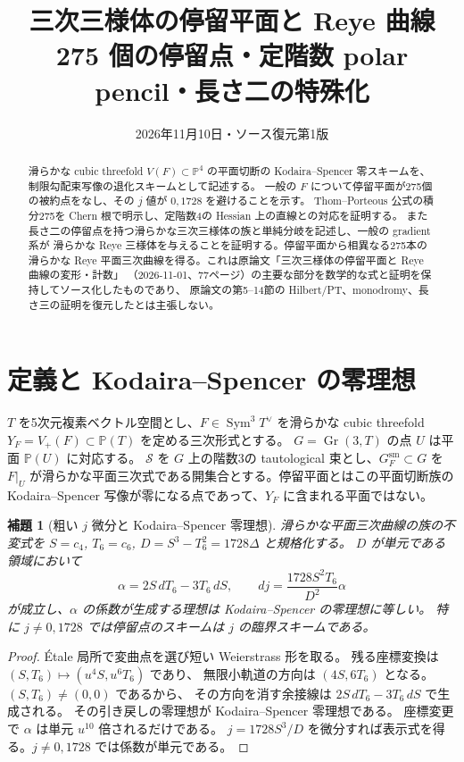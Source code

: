 \documentclass[11pt,a4paper]{ltjsarticle}
\title{三次三様体の停留平面と Reye 曲線\\\large 275 個の停留点・定階数 polar pencil・長さ二の特殊化}
\author{}
\date{2026年11月10日・ソース復元第1版}
\newtheorem{lemma}[theorem]{補題}
\newcommand{\PP}{\mathbb P}
\newcommand{\Gr}{\operatorname{Gr}}
\newcommand{\Sym}{\operatorname{Sym}}
\newcommand{\cS}{\mathcal S}
\begin{document}
\maketitle
\begin{abstract}
滑らかな cubic threefold $V(F)\subset\PP^4$ の平面切断の
Kodaira--Spencer 零スキームを、制限勾配束写像の退化スキームとして記述する。
一般の $F$ について停留平面が275個の被約点をなし、その $j$ 値が $0,1728$ を避けることを示す。
Thom--Porteous 公式の積分275を Chern 根で明示し、定階数4の Hessian 上の直線との対応を証明する。
また長さ二の停留点を持つ滑らかな三次三様体の族と単純分岐を記述し、一般の gradient 系が
滑らかな Reye 三様体を与えることを証明する。停留平面から相異なる275本の滑らかな
Reye 平面三次曲線を得る。これは原論文「三次三様体の停留平面と Reye 曲線の変形・計数」
（2026-11-01、77ページ）の主要な部分を数学的な式と証明を保持してソース化したものであり、
原論文の第5--14節の Hilbert/PT、monodromy、長さ三の証明を復元したとは主張しない。
\end{abstract}
\tableofcontents

\section{定義と Kodaira--Spencer の零理想}
$T$ を5次元複素ベクトル空間とし、$F\in\Sym^3T^\vee$ を滑らかな cubic threefold
$Y_F=V_+(F)\subset\PP(T)$ を定める三次形式とする。
$G=\Gr(3,T)$ の点 $U$ は平面 $\PP(U)$ に対応する。
$\cS$ を $G$ 上の階数3の tautological 束とし、$G_F^{\mathrm{sm}}\subset G$ を
$F|_U$ が滑らかな平面三次式である開集合とする。停留平面とはこの平面切断族の
Kodaira--Spencer 写像が零になる点であって、$Y_F$ に含まれる平面ではない。

\begin{lemma}[粗い $j$ 微分と Kodaira--Spencer 零理想]\label{lem:j}
滑らかな平面三次曲線の族の不変式を $S=c_4$, $T_6=c_6$,
$D=S^3-T_6^2=1728\Delta$ と規格化する\cite[Theorem 4.4]{Fisher}。
$D$ が単元である領域において
\[
 \alpha=2S\,dT_6-3T_6\,dS,\qquad
 dj=\frac{1728S^2T_6}{D^2}\alpha
\]
が成立し、$\alpha$ の係数が生成する理想は Kodaira--Spencer の零理想に等しい。
特に $j\ne0,1728$ では停留点のスキームは $j$ の臨界スキームである。
\end{lemma}
\begin{proof}
\'{E}tale 局所で変曲点を選び短い Weierstrass 形を取る。
残る座標変換は $(S,T_6)\mapsto(u^4S,u^6T_6)$ であり、
無限小軌道の方向は $(4S,6T_6)$ となる。$(S,T_6)\ne(0,0)$ であるから、
その方向を消す余接線は $2S\,dT_6-3T_6\,dS$ で生成される。
その引き戻しの零理想が Kodaira--Spencer 零理想である。
座標変更で $\alpha$ は単元 $u^{10}$ 倍されるだけである。
$j=1728S^3/D$ を微分すれば表示式を得る。$j\ne0,1728$ では係数が単元である。
\end{proof}
\end{document}
